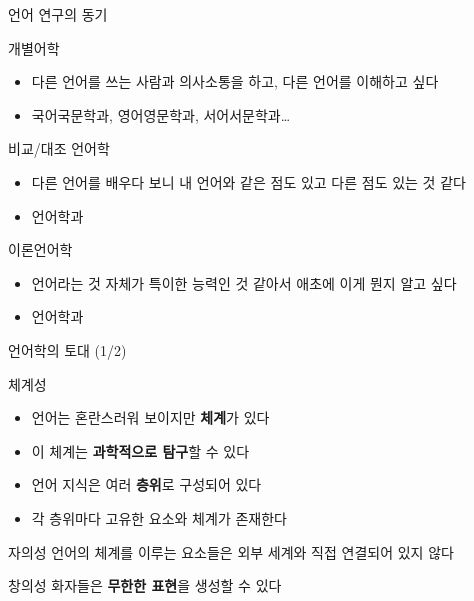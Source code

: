 \documentclass[11pt, aspectratio=169]{beamer}
\begin{document}
\begin{frame}[t]{언어 연구의 동기}
  \begin{block}{개별어학}
    \begin{itemize}
      \item 다른 언어를 쓰는 사람과 의사소통을 하고, 다른 언어를 이해하고 싶다
      \item 국어국문학과, 영어영문학과, 서어서문학과\dots
    \end{itemize}
  \end{block}
  \begin{block}{비교/대조 언어학}
    \begin{itemize}
      \item 다른 언어를 배우다 보니 내 언어와 같은 점도 있고 다른 점도 있는 것 같다
      \item 언어학과
    \end{itemize}    
  \end{block}
  \begin{block}{이론언어학}
    \begin{itemize}
      \item 언어라는 것 자체가 특이한 능력인 것 같아서 애초에 이게 뭔지 알고 싶다
      \item 언어학과
    \end{itemize}    
  \end{block}
\end{frame}

\begin{frame}[t]{언어학의 토대 (1/2)}
  \begin{block}{체계성}
    \begin{itemize}
      \item 언어는 혼란스러워 보이지만 \textbf{체계}가 있다
      \item 이 체계는 \textbf{과학적으로 탐구}할 수 있다
      \item 언어 지식은 여러 \textbf{층위}로 구성되어 있다
      \item 각 층위마다 고유한 요소와 체계가 존재한다
    \end{itemize}
  \end{block}
  \begin{block}{자의성}
    언어의 체계를 이루는 요소들은 외부 세계와 직접 연결되어 있지 않다
  \end{block}
  \begin{block}{창의성}
    화자들은 \textbf{무한한 표현}을 생성할 수 있다
  \end{block}
\end{frame}
\end{document}
